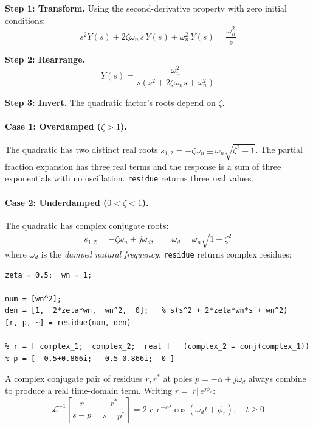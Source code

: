\documentclass[../../book.tex]{subfiles}
\begin{document}
\textbf{Step 1: Transform.}  Using the second-derivative property with zero
initial conditions:
\[
  s^2 Y(s) + 2\zeta\omega_n\,s\,Y(s) + \omega_n^2\,Y(s) = \frac{\omega_n^2}{s}
\]

\textbf{Step 2: Rearrange.}
\begin{equation}
  Y(s) = \frac{\omega_n^2}{s\!\left(s^2 + 2\zeta\omega_n s + \omega_n^2\right)}
  \label{eq:so_ys}
\end{equation}

\textbf{Step 3: Invert.}  The quadratic factor's roots depend on $\zeta$.

\paragraph{Case 1: Overdamped ($\zeta > 1$).}  The quadratic has two distinct
real roots $s_{1,2} = -\zeta\omega_n \pm \omega_n\sqrt{\zeta^2 - 1}$.  The
partial fraction expansion has three real terms and the response is a sum of
three exponentials with no oscillation.  \texttt{residue} returns three real
values.

\paragraph{Case 2: Underdamped ($0 < \zeta < 1$).}  The quadratic has complex
conjugate roots:
\begin{equation}
  s_{1,2} = -\zeta\omega_n \pm j\omega_d,
  \qquad \omega_d = \omega_n\sqrt{1 - \zeta^2}
  \label{eq:complex_poles}
\end{equation}
where $\omega_d$ is the \emph{damped natural frequency}.  \texttt{residue}
returns complex residues:
\begin{Verbatim}[frame=single, fontsize=\small]
zeta = 0.5;  wn = 1;

num = [wn^2];
den = [1,  2*zeta*wn,  wn^2,  0];   % s(s^2 + 2*zeta*wn*s + wn^2)
[r, p, ~] = residue(num, den)

% r = [ complex_1;  complex_2;  real ]   (complex_2 = conj(complex_1))
% p = [ -0.5+0.866i;  -0.5-0.866i;  0 ]
\end{Verbatim}

A complex conjugate pair of residues $r, r^*$ at poles $p = -\alpha \pm
j\omega_d$ always combine to produce a real time-domain term.  Writing
$r = |r|\,e^{j\phi_r}$:
\begin{equation}
  \mathcal{L}^{-1}\!\left[\frac{r}{s-p} + \frac{r^*}{s-p^*}\right]
  = 2|r|\,e^{-\alpha t}\cos(\omega_d t + \phi_r), \quad t \geq 0
  \label{eq:complex_pair}
\end{equation}
\end{document}
